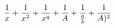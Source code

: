 $${1 \over x} + {1 \over x^2} + {1 \over x^q} + {1 \over A} + {1 \over {a \over b}} + {1 \over {A)^2}}$$
